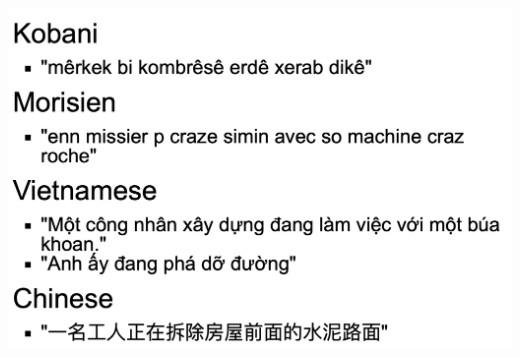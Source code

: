 \documentclass[aspectratio=169]{beamer}
\begin{document}
\begin{frame}[fragile]
\begin{minipage}{.50\textwidth}
\begin{figure}
    \end{figure}
    \end{minipage}%
    \begin{minipage}{.50\textwidth}
    \includegraphics[width=\textwidth]{images/example-flikr-1.png}
    \end{minipage}
\end{frame}
\end{document}
